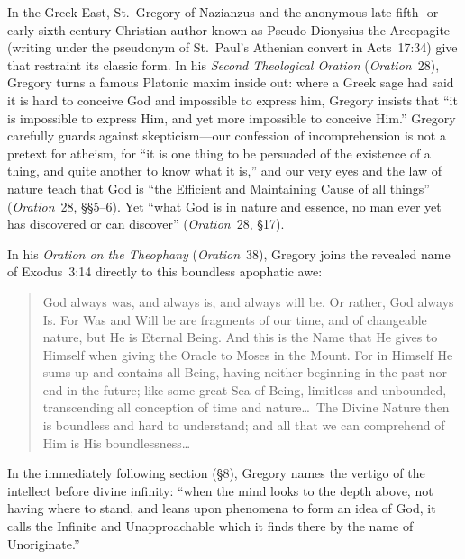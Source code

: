 In the Greek East, St.\ Gregory of Nazianzus and the anonymous late fifth- or early sixth-century Christian author known as Pseudo-Dionysius the Areopagite (writing under the pseudonym of St.\ Paul's Athenian convert in Acts~17:34) give that restraint its classic form. In his \emph{Second Theological Oration} (\emph{Oration}~28), Gregory turns a famous Platonic maxim inside out: where a Greek sage had said it is hard to conceive God and impossible to express him, Gregory insists that ``it is impossible to express Him, and yet more impossible to conceive Him.'' Gregory carefully guards against skepticism---our confession of incomprehension is not a pretext for atheism, for ``it is one thing to be persuaded of the existence of a thing, and quite another to know what it is,'' and our very eyes and the law of nature teach that God is ``the Efficient and Maintaining Cause of all things'' (\emph{Oration}~28, \S\S5--6). Yet ``what God is in nature and essence, no man ever yet has discovered or can discover'' (\emph{Oration}~28, \S17).

In his \emph{Oration on the Theophany} (\emph{Oration}~38), Gregory joins the revealed name of Exodus~3:14 directly to this boundless apophatic awe:

\begin{quote}
God always was, and always is, and always will be. Or rather, God always Is. For Was and Will be are fragments of our time, and of changeable nature, but He is Eternal Being. And this is the Name that He gives to Himself when giving the Oracle to Moses in the Mount. For in Himself He sums up and contains all Being, having neither beginning in the past nor end in the future; like some great Sea of Being, limitless and unbounded, transcending all conception of time and nature\dots\ The Divine Nature then is boundless and hard to understand; and all that we can comprehend of Him is His boundlessness\dots{}
\end{quote}

In the immediately following section (\S8), Gregory names the vertigo of the intellect before divine infinity: ``when the mind looks to the depth above, not having where to stand, and leans upon phenomena to form an idea of God, it calls the Infinite and Unapproachable which it finds there by the name of Unoriginate.''

